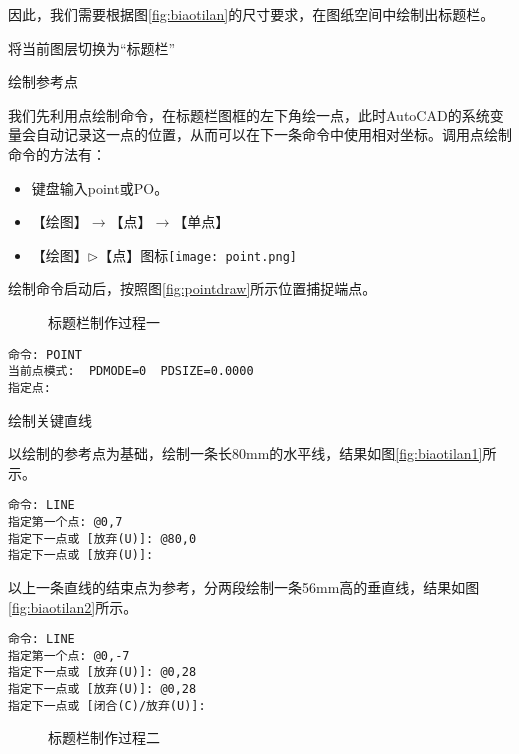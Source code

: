 因此，我们需要根据图\ref{fig:biaotilan}的尺寸要求，在图纸空间中绘制出标题栏。
\begin{procedure}
\item 将当前图层切换为“标题栏”
\item 绘制参考点

我们先利用点绘制命令，在标题栏图框的左下角绘一点，此时AutoCAD的系统变量会自动记录这一点的位置，从而可以在下一条命令中使用相对坐标。调用点绘制命令的方法有：
\begin{itemize}
\item 键盘输入point或PO。
\item 【绘图】$\rightarrow$【点】$\rightarrow$【单点】
\item 【绘图】$\triangleright$【点】图标\texttt{[image: point.png]}
\end{itemize}

绘制命令启动后，按照图\ref{fig:pointdraw}所示位置捕捉端点。
\begin{figure}[htbp]
\centering
{}\hspace{20pt}
\hspace{20pt}
\caption{标题栏制作过程一}
\end{figure}
\begin{lstlisting}
命令: POINT
当前点模式:  PDMODE=0  PDSIZE=0.0000
指定点:
\end{lstlisting}
\item 绘制关键直线

以绘制的参考点为基础，绘制一条长80mm的水平线，结果如图\ref{fig:biaotilan1}所示。
\begin{lstlisting}
命令: LINE
指定第一个点: @0,7
指定下一点或 [放弃(U)]: @80,0
指定下一点或 [放弃(U)]:
\end{lstlisting}

以上一条直线的结束点为参考，分两段绘制一条56mm高的垂直线，结果如图\ref{fig:biaotilan2}所示。
\begin{lstlisting}
命令: LINE
指定第一个点: @0,-7
指定下一点或 [放弃(U)]: @0,28
指定下一点或 [放弃(U)]: @0,28
指定下一点或 [闭合(C)/放弃(U)]:
\end{lstlisting}

\begin{figure}[htbp]
\centering
{}\hspace{20pt}
\hspace{20pt}
\caption{标题栏制作过程二}
\end{figure}


\end{procedure}

